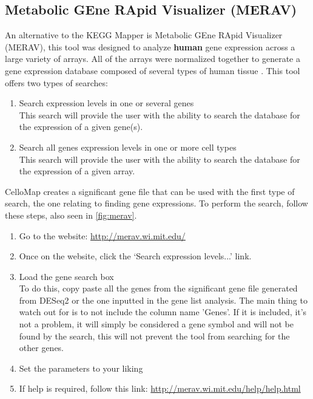 \documentclass[11pt]{article}
\begin{document}
\subsection{Metabolic GEne RApid Visualizer (MERAV)\label{MERAV}}
An alternative to the KEGG Mapper is Metabolic GEne RApid Visualizer (MERAV), this tool was designed to analyze \textbf{human} gene expression across a large variety of arrays. All of the arrays were normalized together to generate a gene expression database composed of several types of human tissue \cite{shaul2015merav}.
This tool offers two types of searches:
\begin{enumerate}
\item Search expression levels in one or several genes\\
This search will provide the user with the ability to search the database for the expression of a given gene(s).
\item Search all genes expression levels in one or more cell types\\
This search will provide the user with the ability to search the database for the expression of a given array.
\end{enumerate}

CelloMap creates a significant gene file that can be used with the first type of search, the one relating to finding gene expressions. To perform the search, follow these steps, also seen in \autoref{fig:merav}.
\begin{enumerate}
\item Go to the website: \url{http://merav.wi.mit.edu/}
\item Once on the website, click the `Search expression levels...' link.
\item Load the gene search box\\
To do this, copy paste all the genes from the significant gene file generated from DESeq2 or the one inputted in the gene list analysis. The main thing to watch out for is to not include the column name 'Genes'. If it is included, it's not a problem, it will simply be considered a gene symbol and will not be found by the search, this will not prevent the tool from searching for the other genes.
\item Set the parameters to your liking
\item If help is required, follow this link: \url{http://merav.wi.mit.edu/help/help.html}
\end{enumerate}
\end{document}
